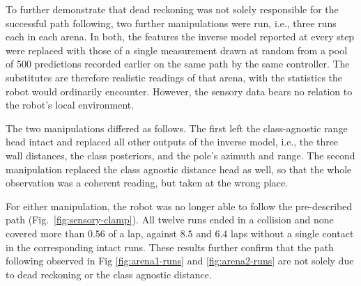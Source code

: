 \documentclass[11pt]{article}
\begin{document}
To further demonstrate that dead reckoning was not solely responsible for the successful path following, two further manipulations were run, i.e., three runs each in each arena. In both, the features the inverse model reported at every step were replaced with those of a single measurement drawn at random from a pool of $500$ predictions recorded earlier on the same path by the same controller. The substitutes are therefore realistic readings of that arena, with the statistics the robot would ordinarily encounter. However, the sensory data bears no relation to the robot's local environment.

The two manipulations differed as follows. The first left the class-agnostic range head intact and replaced all other outputs of the inverse model, i.e., the three wall distances, the class posteriors, and the pole's azimuth and range. The second manipulation replaced the class agnostic distance head as well, so that the whole observation was a coherent reading, but taken at the wrong place.

For either manipulation, the robot was no longer able to follow the pre-described path (Fig.~\ref{fig:sensory-clamp}).
All twelve runs ended in a collision and none covered more than $0.56$ of a lap, against $8.5$ and $6.4$ laps without a single contact in the corresponding intact runs. 
%
These results further confirm that the path following observed in  Fig \ref{fig:arena1-runs} and \ref{fig:arena2-runs} are not solely due to dead reckoning or the class agnostic distance.





\end{document}
